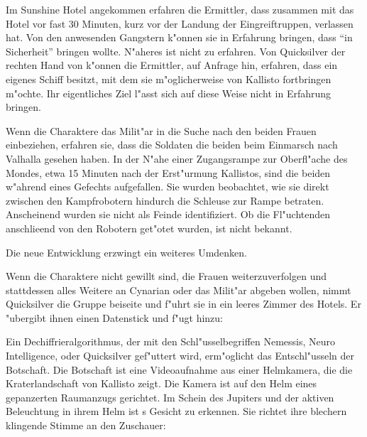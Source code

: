 Im Sunshine Hotel angekommen erfahren die Ermittler, dass \xl{} zusammen mit \ml{} das Hotel vor fast 30 Minuten, kurz vor der Landung der Eingreiftruppen, verlassen hat. Von den anwesenden Gangstern k"onnen sie in Erfahrung bringen, dass \xl{} \ml{} ``in Sicherheit'' bringen wollte. N"aheres ist nicht zu erfahren. Von Quicksilver der rechten Hand von \xl{} k"onnen die Ermittler, auf Anfrage hin, erfahren, dass \xl{} ein eigenes Schiff besitzt, mit dem sie m"oglicherweise \ml{} von Kallisto fortbringen m"ochte. Ihr eigentliches Ziel l"asst sich auf diese Weise nicht in Erfahrung bringen. 

Wenn die Charaktere das Milit"ar in die Suche nach den beiden Frauen einbeziehen, erfahren sie, dass die Soldaten die beiden beim Einmarsch nach Valhalla gesehen haben. In der N"ahe einer Zugangsrampe zur Oberfl"ache des Mondes, etwa 15 Minuten nach der Erst"urmung Kallistos, sind die beiden w"ahrend eines Gefechts aufgefallen. Sie wurden beobachtet, wie sie direkt zwischen den Kampfrobotern hindurch die Schleuse zur Rampe betraten. Anscheinend wurden sie nicht als Feinde identifiziert. Ob die Fl"uchtenden anschlie\3end von den Robotern get"otet wurden, ist nicht bekannt.

Die neue Entwicklung erzwingt ein weiteres Umdenken.

Wenn die Charaktere nicht gewillt sind, die Frauen weiterzuverfolgen und stattdessen alles Weitere an Cynarian oder das Milit"ar abgeben wollen, nimmt Quicksilver die Gruppe beiseite und f"uhrt sie in ein leeres Zimmer des Hotels. Er "ubergibt ihnen einen Datenstick und f"ugt hinzu: 


Ein Dechiffrieralgorithmus, der mit den Schl"usselbegriffen Nemessis, Neuro Intelligence, \xl{} oder Quicksilver gef"uttert wird, erm"oglicht das Entschl"usseln der Botschaft. Die Botschaft ist eine Videoaufnahme aus einer Helmkamera, die die Kraterlandschaft von Kallisto zeigt. Die Kamera ist auf den Helm eines gepanzerten Raumanzugs gerichtet. Im Schein des Jupiters und der aktiven Beleuchtung in ihrem Helm ist \xl{}s Gesicht zu erkennen. Sie richtet ihre blechern klingende Stimme an den Zuschauer:

